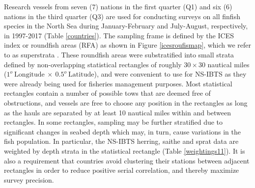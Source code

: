 \documentclass[a4paper 12pt]{article}
\numberwithin{equation}{section}
\begin{document}
\indent Research vessels from seven (7) nations in the first quarter (Q1) and six (6) nations in the third quarter (Q3) are used for conducting surveys on all finfish species in the North Sea during January-February and July-August, respectively, in 1997-2017 (Table \ref{countries}). The sampling frame is defined by the ICES index or roundfish areas (RFA) as shown in Figure \ref{icesroufismap}, which we refer to as superstrata \citep{nottestad2015quantifying, fuller2011sampling}. These  roundfish areas were substratified into small strata defined by non-overlapping statistical rectangles of roughly $30 \times 30$ nautical miles ($1^{o} \  \mathrm{Longitude} \ \times  \  0.5^{o} \ \mathrm{Latitude}$), and were convenient to use for NS-IBTS as they were already being used for fisheries management purposes. Most statistical rectangles contain a number of possible tows that are deemed free of obstructions, and vessels are free to choose any position in the rectangles as long as the hauls are separated by at least 10 nautical miles within and between rectangles. In some rectangles, sampling may be further stratified due to significant changes in seabed depth which may, in turn, cause variations in the fish population. In particular, the NS-IBTS herring, saithe and sprat data are weighted by depth strata in the statistical rectangle (Table \ref{weightings11}). It is also a requirement that countries avoid clustering their stations between adjacent rectangles in order to reduce positive serial correlation, and thereby maximize survey precision. \\
\end{document}

